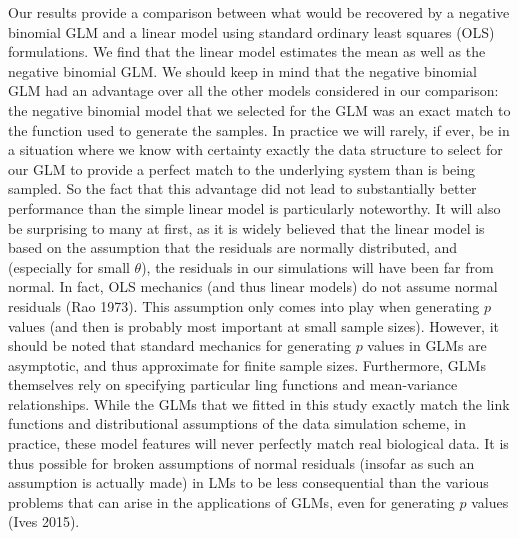 \documentclass[]{article}
\begin{document}
Our results provide a comparison between what would be recovered by a
negative binomial GLM and a linear model using standard ordinary least
squares (OLS) formulations. We find that the linear model estimates the
mean as well as the negative binomial GLM. We should keep in mind that
the negative binomial GLM had an advantage over all the other models
considered in our comparison: the negative binomial model that we
selected for the GLM was an exact match to the function used to generate
the samples. In practice we will rarely, if ever, be in a situation
where we know with certainty exactly the data structure to select for
our GLM to provide a perfect match to the underlying system than is
being sampled. So the fact that this advantage did not lead to
substantially better performance than the simple linear model is
particularly noteworthy. It will also be surprising to many at first, as
it is widely believed that the linear model is based on the assumption
that the residuals are normally distributed, and (especially for small
\(\theta\)), the residuals in our simulations will have been far from
normal. In fact, OLS mechanics (and thus linear models) do not assume
normal residuals (Rao 1973). This assumption only comes into play when
generating \(p\) values (and then is probably most important at small
sample sizes). However, it should be noted that standard mechanics for
generating \(p\) values in GLMs are asymptotic, and thus approximate for
finite sample sizes. Furthermore, GLMs themselves rely on specifying
particular ling functions and mean-variance relationships. While the
GLMs that we fitted in this study exactly match the link functions and
distributional assumptions of the data simulation scheme, in practice,
these model features will never perfectly match real biological data. It
is thus possible for broken assumptions of normal residuals (insofar as
such an assumption is actually made) in LMs to be less consequential
than the various problems that can arise in the applications of GLMs,
even for generating \(p\) values (Ives 2015).
\end{document}
